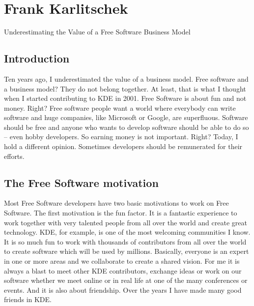 
\chapter{Frank Karlitschek}{Underestimating the Value of a Free Software Business Model}

\section*{Introduction}

Ten years ago, I underestimated the value of a business model. Free software and
a business model? They do not belong together. At least, that is what I thought
when I started contributing to KDE in 2001. Free Software is about fun and not
money. Right? Free software people want a world where everybody can write
software and huge companies, like Microsoft or Google, are superfluous. Software
should be free and anyone who wants to develop software should be able to do so
-- even hobby developers. So earning money is not important. Right? Today, I
hold a different opinion. Sometimes developers should be remunerated for their
efforts.  

\section*{The Free Software motivation}

Most Free Software developers have two basic motivations to work on Free
Software. The first motivation is the fun factor. It is a fantastic experience
to work together with very talented people from all over the world and create
great technology. KDE, for example, is one of the most welcoming communities I
know. It is so much fun to work with thousands of contributors from all over the
world to create software which will be used by millions. Basically, everyone is
an expert in one or more areas and we collaborate to create a shared vision. For
me it is always a blast to meet other KDE contributors, exchange ideas or work
on our software whether we meet online or in real life at one of the many
conferences or events. And it is also about friendship. Over the years I have
made many good friends in KDE.

